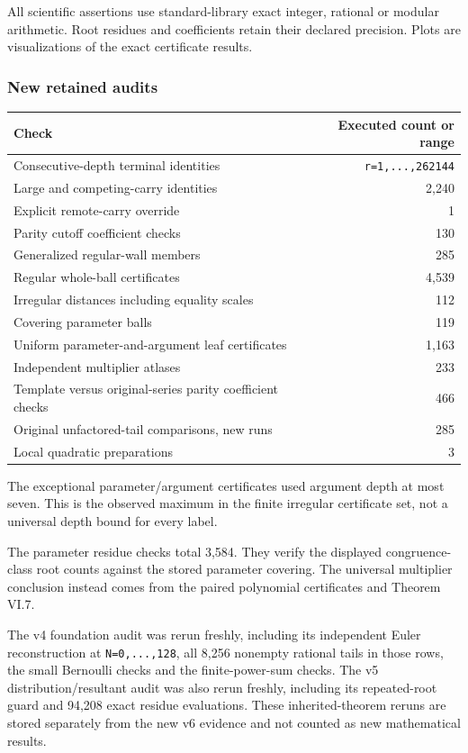 \documentclass[11pt,letterpaper]{article}
\begin{document}
All scientific assertions use standard-library exact integer, rational or modular arithmetic. Root residues and coefficients retain their declared precision. Plots are visualizations of the exact certificate results.

\subsubsection{New retained audits}\label{new-retained-audits}

\begin{longtable}[]{@{}lr@{}}
\toprule\noalign{}
Check & Executed count or range \\
\midrule\noalign{}
\endhead
\bottomrule\noalign{}
\endlastfoot
Consecutive-depth terminal identities & \texttt{r=1,...,262144} \\
Large and competing-carry identities & 2,240 \\
Explicit remote-carry override & 1 \\
Parity cutoff coefficient checks & 130 \\
Generalized regular-wall members & 285 \\
Regular whole-ball certificates & 4,539 \\
Irregular distances including equality scales & 112 \\
Covering parameter balls & 119 \\
Uniform parameter-and-argument leaf certificates & 1,163 \\
Independent multiplier atlases & 233 \\
Template versus original-series parity coefficient checks & 466 \\
Original unfactored-tail comparisons, new runs & 285 \\
Local quadratic preparations & 3 \\
\end{longtable}

The exceptional parameter/argument certificates used argument depth at most seven. This is the observed maximum in the finite irregular certificate set, not a universal depth bound for every label.

The parameter residue checks total 3,584. They verify the displayed congruence-class root counts against the stored parameter covering. The universal multiplier conclusion instead comes from the paired polynomial certificates and Theorem VI.7.

The v4 foundation audit was rerun freshly, including its independent Euler reconstruction at \texttt{N=0,...,128}, all 8,256 nonempty rational tails in those rows, the small Bernoulli checks and the finite-power-sum checks. The v5 distribution/resultant audit was also rerun freshly, including its repeated-root guard and 94,208 exact residue evaluations. These inherited-theorem reruns are stored separately from the new v6 evidence and not counted as new mathematical results.
\end{document}
